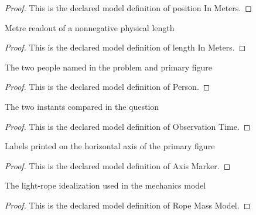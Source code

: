 \begin{proof}
  This is the declared model definition of position In Meters.
\end{proof}
\begin{definition}
  \label{def:physics:phyx-mini-0817:phyxminiproblems-problemphyxmini0817-lengthinmeters}
  Metre readout of a nonnegative physical length
\end{definition}
\begin{proof}
  This is the declared model definition of length In Meters.
\end{proof}
\begin{definition}[Person]
  \label{def:physics:phyx-mini-0817:phyxminiproblems-problemphyxmini0817-person}
  The two people named in the problem and primary figure
\end{definition}
\begin{proof}
  This is the declared model definition of Person.
\end{proof}
\begin{definition}
  \label{def:physics:phyx-mini-0817:phyxminiproblems-problemphyxmini0817-observationtime}
  The two instants compared in the question
\end{definition}
\begin{proof}
  This is the declared model definition of Observation Time.
\end{proof}
\begin{definition}
  \label{def:physics:phyx-mini-0817:phyxminiproblems-problemphyxmini0817-axismarker}
  Labels printed on the horizontal axis of the primary figure
\end{definition}
\begin{proof}
  This is the declared model definition of Axis Marker.
\end{proof}
\begin{definition}
  \label{def:physics:phyx-mini-0817:phyxminiproblems-problemphyxmini0817-ropemassmodel}
  The light-rope idealization used in the mechanics model
\end{definition}
\begin{proof}
  This is the declared model definition of Rope Mass Model.
\end{proof}
